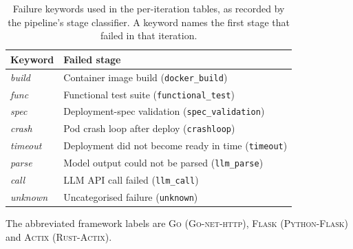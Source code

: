 \begin{table}[htbp]
  \centering
  \caption{Failure keywords used in the per-iteration tables, as recorded
    by the pipeline's stage classifier. A keyword names the first stage
    that failed in that iteration.}
  \label{tab:appendix-iter-legend}
  \small
  \begin{tabular}{@{}ll@{}}
    \toprule
    \textbf{Keyword} & \textbf{Failed stage} \\
    \midrule
    \textit{build}   & Container image build (\texttt{docker\_build}) \\
    \textit{func}    & Functional test suite (\texttt{functional\_test}) \\
    \textit{spec}    & Deployment-spec validation (\texttt{spec\_validation}) \\
    \textit{crash}   & Pod crash loop after deploy (\texttt{crashloop}) \\
    \textit{timeout} & Deployment did not become ready in time (\texttt{timeout}) \\
    \textit{parse}   & Model output could not be parsed (\texttt{llm\_parse}) \\
    \textit{call}    & LLM API call failed (\texttt{llm\_call}) \\
    \textit{unknown} & Uncategorised failure (\texttt{unknown}) \\
    \bottomrule
  \end{tabular}
\end{table}

The abbreviated framework labels are \textsc{Go} (\textsc{Go-net-http}),
\textsc{Flask} (\textsc{Python-Flask}) and \textsc{Actix}
(\textsc{Rust-Actix}).

\FloatBarrier

